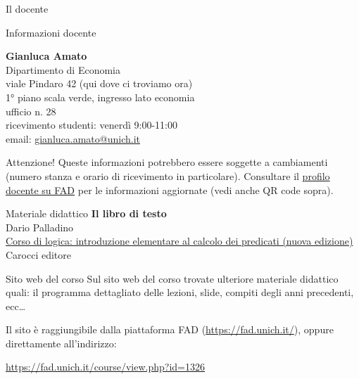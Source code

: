 \documentclass[10pt]{beamer}
\begin{document}
\begin{frame}{Il docente}
	\begin{block}{Informazioni docente}
		\begin{minipage}{0.7\linewidth}
			\textbf{Gianluca Amato}\\
			Dipartimento di Economia\\
			viale Pindaro 42 (qui dove ci troviamo ora)\\
			1° piano scala verde, ingresso lato economia\\
			ufficio n. 28\\
			\medskip
			ricevimento studenti: venerdì 9:00-11:00\\
			email: \href{mailto:gianluca.amato@unich.it}{gianluca.amato@unich.it}
		\end{minipage}%
		\begin{minipage}{0.3\linewidth}
		\end{minipage}
	\end{block}

	\begin{alertblock}{Attenzione!}
		Queste informazioni potrebbero essere soggette a cambiamenti (numero stanza e orario di ricevimento in particolare). Consultare il \href{https://fad.unich.it/user/profile.php?id=1827}{profilo docente su FAD} per le informazioni aggiornate (vedi anche QR code sopra).
	\end{alertblock}
\end{frame}

\begin{frame}{Materiale didattico}
	\textbf{Il libro di testo}\\

	\medskip
	Dario Palladino\\
	\href{https://www.carocci.it/prodotto/corso-di-logica-3}{Corso di logica: introduzione elementare al calcolo dei predicati (nuova edizione)}\\
	Carocci editore\\

	\bigskip
	\centering
\end{frame}

\begin{frame}{Sito web del corso}
	Sul sito web del corso trovate ulteriore materiale didattico quali: il programma dettagliato delle lezioni, slide, compiti degli anni precedenti, ecc\ldots

	\medskip Il sito è raggiungibile dalla piattaforma FAD (\url{https://fad.unich.it/}), oppure direttamente all'indirizzo:

	\begin{center}
		\url{https://fad.unich.it/course/view.php?id=1326} \qquad
	\end{center}
\end{frame}
\end{document}
